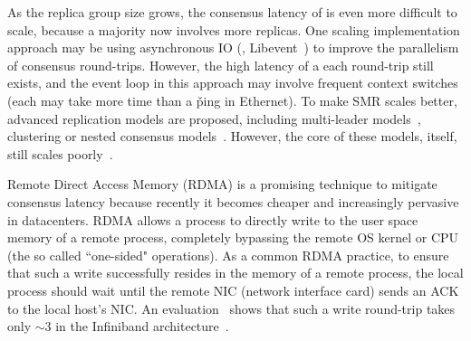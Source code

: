 
As the replica group size grows, the consensus latency of \paxos is even more 
difficult to scale, because a majority now involves more replicas. One 
scaling implementation approach may be using asynchronous IO (\eg, 
Libevent~\cite{libevent}) to improve the parallelism of consensus round-trips. 
However, the high latency of a each round-trip still exists, and the event loop 
in this approach may involve frequent context switches (each may take more time 
than a \v{ping} in Ethernet). To make SMR scales better, advanced replication 
models are proposed, including multi-leader 
models~\cite{epaxos:sosp13,mencius:osdi08}, clustering or nested consensus 
models~\cite{scatter:sosp11,manos:hotdep10}. However, the core of these models, 
\paxos itself, still scales poorly~\cite{ellis:thesis}.




Remote Direct Access Memory (RDMA) is a promising technique to mitigate 
consensus latency because recently it becomes cheaper and increasingly 
pervasive in datacenters. RDMA allows a process to directly write to the 
user space memory of a remote process, completely bypassing the remote OS 
kernel or CPU (the so called ``one-sided" operations). As a common 
RDMA practice, to ensure that such a write successfully resides in the 
memory of a remote process, the local process should wait until the remote NIC 
(network interface card) sends an ACK to the local host's NIC. An 
evaluation~\cite{pilaf:usenix14} shows that such a write round-trip takes only 
$\sim$3 \us in the Infiniband architecture~\cite{infiniband}.


